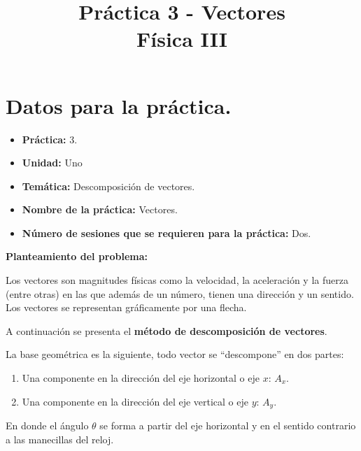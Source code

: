 \documentclass[14pt]{extarticle}
\title{\vspace*{-2cm} Práctica 3 - Vectores \\  Física III\vspace{-5ex}}
\date{}
\begin{document}
\maketitle

\section{Datos para la práctica.}

\begin{itemize}
\itemsep0em 
\item  \textbf{Práctica:} 3.
\item \textbf{Unidad:} Uno
\item \textbf{Temática:} Descomposición de vectores.
\item \textbf{Nombre de la práctica:} Vectores.
\item \textbf{Número de sesiones que se requieren para la práctica:} Dos.
\end{itemize}
\textbf{Planteamiento del problema:} 

\vspace*{0.5cm}
Los vectores son magnitudes físicas como la velocidad, la aceleración y la fuerza (entre otras) en las que además de un número, tienen una dirección y un sentido. Los vectores se representan gráficamente por una flecha.
\begin{figure}[H]
    \centering
\end{figure}

\vspace*{0.4cm}
A continuación se presenta el \textbf{método de descomposición de vectores}.

\vspace*{0.4cm}
La base geométrica es la siguiente, todo vector se \enquote{descompone} en dos partes:
\begin{enumerate}
\item Una componente en la dirección del eje horizontal o eje $x$: $A_{x}$.
\item Una componente en la dirección del eje vertical o eje $y$: $A_{y}$.
\end{enumerate}
\begin{figure}[H]
    \centering
\end{figure}
En donde el ángulo $\theta$ se forma a partir del eje horizontal y en el sentido contrario a las manecillas del reloj.
\end{document}
